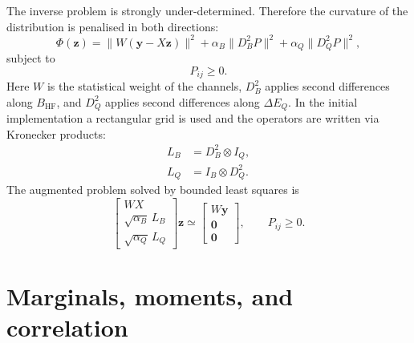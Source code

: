 \documentclass[11pt,a4paper]{article}
\newcommand{\BHF}{B_{\mathrm{HF}}}
\newcommand{\DEQ}{\Delta E_Q}
\begin{document}
The inverse problem is strongly under-determined. Therefore the curvature of
the distribution is penalised in both directions:
\begin{equation}
  \Phi(\bm z)=\|W(\bm y-X\bm z)\|^2
  +\alpha_B\|D_B^2 P\|^2
  +\alpha_Q\|D_Q^2 P\|^2,
\end{equation}
subject to
\begin{equation}
  P_{ij}\ge 0.
\end{equation}
Here $W$ is the statistical weight of the channels, $D_B^2$ applies second
differences along $\BHF$, and $D_Q^2$ applies second differences along
$\DEQ$. In the initial implementation a rectangular grid is used and the
operators are written via Kronecker products:
\begin{align}
  L_B &= D_B^2\otimes I_Q,\\
  L_Q &= I_B\otimes D_Q^2.
\end{align}
The augmented problem solved by bounded least squares is
\begin{equation}
  \begin{bmatrix}
    WX\\
    \sqrt{\alpha_B}\,L_B\\
    \sqrt{\alpha_Q}\,L_Q
  \end{bmatrix}\bm z
  \simeq
  \begin{bmatrix}
    W\bm y\\
    \bm 0\\
    \bm 0
  \end{bmatrix},
  \qquad P_{ij}\ge 0.
\end{equation}

\section{Marginals, moments, and correlation}
\end{document}

